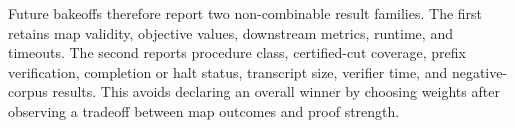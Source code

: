 Future bakeoffs therefore report two non-combinable result families. The first
retains map validity, objective values, downstream metrics, runtime, and
timeouts. The second reports procedure class, certified-cut coverage, prefix
verification, completion or halt status, transcript size, verifier time, and
negative-corpus results. This avoids declaring an overall winner by choosing
weights after observing a tradeoff between map outcomes and proof strength.

